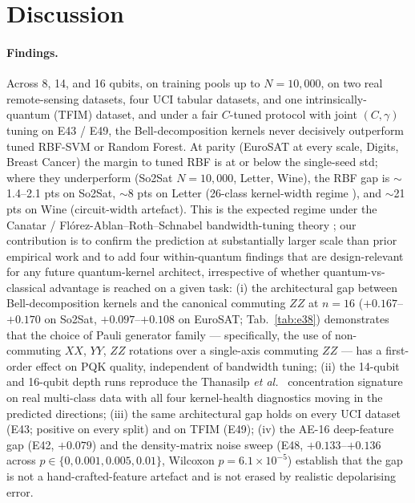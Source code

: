 \documentclass[pdflatex,sn-mathphys]{sn-jnl}
\theoremstyle{plain}
\theoremstyle{remark}
\theoremstyle{definition}
\begin{document}
\section{Discussion}\label{sec:disc}

\paragraph{Findings.}
Across 8, 14, and 16 qubits, on training pools up to $N=10{,}000$, on two real remote-sensing datasets, four UCI tabular datasets, and one intrinsically-quantum (TFIM) dataset, and under a fair $C$-tuned protocol with joint $(C, \gamma)$ tuning on E43 / E49, the Bell-decomposition kernels never decisively outperform tuned RBF-SVM or Random Forest.  At parity (EuroSAT at every scale, Digits, Breast Cancer) the margin to tuned RBF is at or below the single-seed std; where they underperform (So2Sat $N=10{,}000$, Letter, Wine), the RBF gap is $\sim$1.4--2.1 pts on So2Sat, $\sim$8 pts on Letter (26-class kernel-width regime \cite{schnabel2025}), and $\sim$21 pts on Wine (circuit-width artefact).  This is the expected regime under the Canatar / Fl{\'o}rez-Ablan--Roth--Schnabel bandwidth-tuning theory \cite{canatar2022,florezablan2025}; our contribution is to confirm the prediction at substantially larger scale than prior empirical work \cite{bowles2024,schnabel2025,rodriguez2025} and to add four within-quantum findings that are design-relevant for any future quantum-kernel architect, irrespective of whether quantum-vs-classical advantage is reached on a given task: (i) the architectural gap between Bell-decomposition kernels and the canonical commuting $ZZ$ at $n=16$ ($+0.167$--$+0.170$ on So2Sat, $+0.097$--$+0.108$ on EuroSAT; Tab.~\ref{tab:e38}) demonstrates that the choice of Pauli generator family --- specifically, the use of non-commuting $XX$, $YY$, $ZZ$ rotations over a single-axis commuting $ZZ$ --- has a first-order effect on PQK quality, independent of bandwidth tuning; (ii) the 14-qubit and 16-qubit depth runs reproduce the Thanasilp \emph{et al.}\ \cite{thanasilp2024} concentration signature on real multi-class data with all four kernel-health diagnostics moving in the predicted directions; (iii) the same architectural gap holds on every UCI dataset (E43; positive on every split) and on TFIM (E49); (iv) the AE-16 deep-feature gap (E42, $+0.079$) and the density-matrix noise sweep (E48, $+0.133$--$+0.136$ across $p\in\{0, 0.001, 0.005, 0.01\}$, Wilcoxon $p=6.1\!\times\!10^{-5}$) establish that the gap is not a hand-crafted-feature artefact and is not erased by realistic depolarising error.
\end{document}
